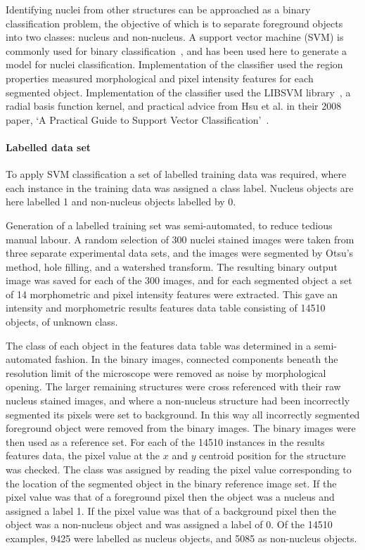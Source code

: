 Identifying nuclei from other structures can be approached as a binary classification problem, the objective of which is to separate foreground objects into two classes: nucleus and non-nucleus. A support vector machine (SVM) is commonly used for binary classification~\cite{Cortes1995}, and has been used here to generate a model for nuclei classification. Implementation of the classifier used the region properties measured morphological and pixel intensity features for each segmented object. Implementation of the classifier used the LIBSVM library~\cite{Chang2011}, a radial basis function kernel, and practical advice from
Hsu et al. in their 2008 paper, `A Practical Guide to Support Vector Classification'~\cite{Hsu2008}.

\paragraph{Labelled data set}
To apply SVM classification a set of labelled training data was required, where each instance in the training data was assigned a class label. Nucleus objects are here labelled 1 and non-nucleus objects labelled by 0.

Generation of a labelled training set was semi-automated, to reduce tedious manual labour. A random selection of 300 nuclei stained images were taken from three separate experimental data sets, and the images were segmented by Otsu's method, hole filling, and a watershed transform. The resulting binary output image was saved for each of the 300 images, and for each segmented object a set of 14 morphometric and pixel intensity features were extracted. This gave an intensity and morphometric results features data table consisting of 14510 objects, of unknown class.

The class of each object in the features data table was determined in a semi-automated fashion. In the binary images, connected components beneath the resolution limit of the microscope were removed as noise by morphological opening. The larger remaining structures were cross referenced with their raw nucleus stained images, and where a non-nucleus structure had been incorrectly segmented its pixels were set to background. In this way all incorrectly segmented foreground object were removed from the binary images. The binary images were then used as a reference set. For each of the 14510 instances in the results features data, the pixel value at the $x$ and $y$ centroid position for the structure was checked. The class was assigned by reading the pixel value corresponding to the location of the segmented object in the binary reference image set. If the pixel value was that of a foreground pixel then the object was a nucleus and assigned a label 1. If the pixel value was that of a background pixel then the object was a non-nucleus object and was assigned a label of 0. Of the 14510 examples, 9425 were labelled as nucleus objects, and 5085 as non-nucleus objects.

